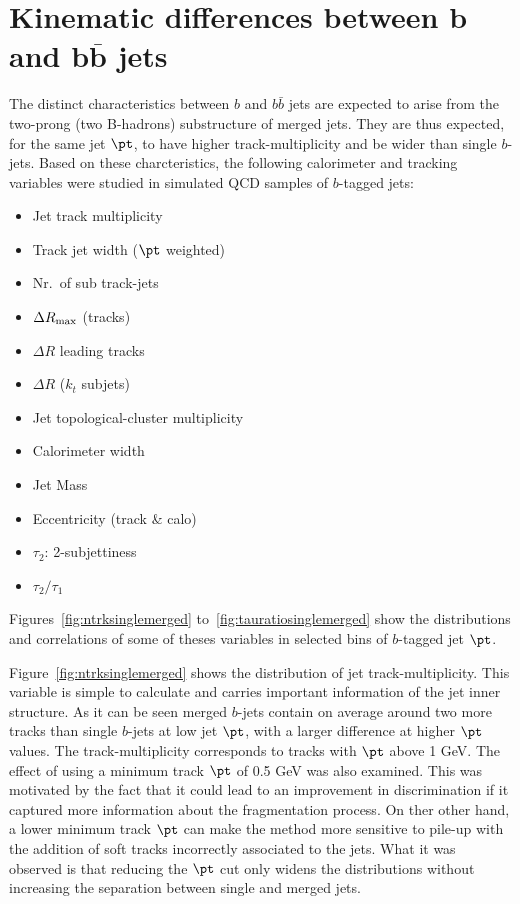 \section{Kinematic differences between $\bm b$ and $\bm{b \bar{b}}$ jets}\label{sec:kinematic}

The distinct characteristics between $b$ and $b \bar{b}$ jets are expected to arise from the two-prong (two B-hadrons) substructure of merged jets.  They are thus expected, for the same jet $\pt$, to have higher track-multiplicity and be wider than single $b$-jets. Based on these charcteristics, the following calorimeter and tracking variables were studied in simulated QCD samples of $b$-tagged jets:

\begin{itemize}\addtolength{\itemsep}{-0.4\baselineskip}
\item
Jet track multiplicity
\item
Track jet width ($\pt$ weighted)
\item
Nr.\ of sub track-jets
\item
$\Delta R_{\rm max}$ (tracks)
\item
$\Delta R$ leading tracks
\item
$\Delta R$ ($k_t$ subjets)
\item
Jet topological-cluster multiplicity
\item
Calorimeter width
\item 
Jet Mass
\item 
Eccentricity (track \& calo)
\item
$\tau_2$: 2-subjettiness 
\item
$\tau_2/\tau_1$
\end{itemize}




Figures~\ref{fig:ntrksinglemerged} to~\ref{fig:tauratiosinglemerged} show the distributions and correlations of some of theses variables in selected bins of $b$-tagged jet $\pt$.

Figure~\ref{fig:ntrksinglemerged} shows the distribution of jet track-multiplicity. This variable is simple to calculate and carries important information of the jet inner structure. As it can be seen merged $b$-jets contain on average around two more tracks than single $b$-jets at low jet $\pt$, with a larger difference at higher $\pt$ values. The track-multiplicity corresponds to tracks with $\pt$ above 1 GeV. The effect of using a minimum track $\pt$ of 0.5 GeV was also examined. This was motivated by the fact that it could lead to an improvement in discrimination if it captured more information about the fragmentation process.  On ther other hand, a lower minimum track $\pt$ can make the method more sensitive to pile-up with the addition of soft tracks incorrectly associated to the jets.  What it was observed is that reducing the $\pt$ cut only widens the distributions without increasing the separation between single and merged jets. 

